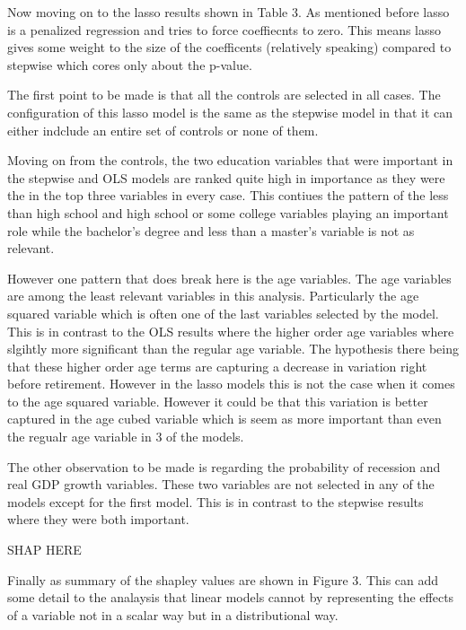 \documentclass[12pt]{article}
\begin{document}
\begin{onehalfspace}
Now moving on to the lasso results shown in Table 3. As mentioned before lasso is a penalized regression and tries to force coeffiecnts to zero. This means lasso gives some weight to the size of the coefficents (relatively speaking) compared to stepwise which cores only about the p-value. 

The first point to be made is that all the controls are selected in all cases. The configuration of this lasso model is the same as the stepwise model in that it can either indclude an entire set of controls or none of them. 

Moving on from the controls, the two education variables that were important in the stepwise and OLS models are ranked quite high in importance as they were the in the top three variables in every case. This contiues the pattern of the less than high school and high school or some college variables playing an important role while the bachelor's degree and less than a master's variable is not as relevant. 

However one pattern that does break here is the age variables. The age variables are among the least relevant variables in this analysis. Particularly the age squared variable which is often one of the last variables selected by the model. This is in contrast to the OLS results where the higher order age variables where slgihtly more significant than the regular age variable. The hypothesis there being that these higher order age terms are capturing a decrease in variation right before retirement. However in the lasso models this is not the case when it comes to the age squared variable. However it could be that this variation is better captured in the age cubed variable which is seem as more important than even the regualr age variable in 3 of the models.

The other observation to be made is regarding the probability of recession and real GDP growth variables. These two variables are not selected in any of the models except for the first model. This is in contrast to the stepwise results where they were both important. 

SHAP HERE

Finally as summary of the shapley values are shown in Figure 3. This can add some detail to the analaysis that linear models cannot by representing the effects of a variable not in a scalar way but in a distributional way.


\end{onehalfspace}
\end{document}
